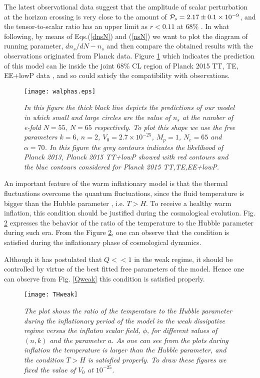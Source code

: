 \documentclass[12pt]{revtex4}
\begin{document}
The latest observational data suggest that the amplitude of
scalar perturbation at the horizon crossing is very close {to the amount of}
{${\cal P}_s=2.17\pm 0.1\times 10^{-9}$}, and the tensor-to-scalar
ratio  has an upper limit as $r < 0.11$ at 68\% { \cite{Planck2015}}.
In what following, by means of Eqs.(\ref{dnsN}) and (\ref{nsN}) {we  want to plot  the diagram of} running parameter, $d{n_s}/dN -
{n_s}$ and then compare the obtained results with the observations originated from Planck data.   Figure \ref{fignsdns1} which indicates  the prediction of this model  can lie {inside} the joint 68\% CL region of Planck 2015 TT, TE, EE+lowP data {\cite{Planck2015,Planck2018}}, and so could satisfy the  compatibility with observations.
\begin{figure}[ht]
\centering
\texttt{[image: walphas.eps]}
\caption{{\it{
 In this figure the thick black line
depicts the predictions of our model in which small and large circles are the value of $n_s$ at the number of e-fold $N=55,~N=65$ respectively. To plot this shape we use the free parameters $k=6$,  $n=2$, $V_0=2.7\times 10^{-25}$, $M_p=1$, $N_e=65$ and $\alpha=70$.
In this figure  the grey contours indicates the likelihood  of  Planck 2013, Planck 2015 TT+lowP showed with red contours and the blue contours considered for Planck 2015 TT,TE,EE+lowP.}}}
\label{fignsdns1}
\end{figure}

{An important feature of the warm inflationary model is that the thermal fluctuations overcome the quantum fluctuations, since the fluid temperature is bigger than the Hubble parameter , i.e. $T>H$. To receive a healthy warm inflation, this condition should be justified during the cosmological evolution. Fig. \ref{thweak} expresses the behavior of the ratio of the temperature to the Hubble parameter during such era. From the Figure \ref{thweak}, one can observe that the condition is satisfied during the inflationary phase of cosmological dynamics.}

{Although it has postulated that $Q<<1$ in the weak regime, it should be controlled by virtue of the best fitted free parameters of the model. Hence one can observe from Fig. \ref{Qweak} this condition is satisfied properly.}

\begin{figure}[ht]
  \centering
  \texttt{[image: THweak]}
  \caption{\emph{{The plot shows the ratio of the temperature to the Hubble parameter during the inflationary period of the  model in the weak dissipative regime versus the inflaton scalar field, $\phi$, for different values of $(n,k)$ and the parameter $a$. As one can see from the plots during inflation the temperature is larger than the Hubble parameter, and the condition $T>H$ is satisfied properly. To draw these figures we fixed the value of $V_0$ at $10^{-25}$}.}}\label{thweak}
\end{figure}%
\end{document}
